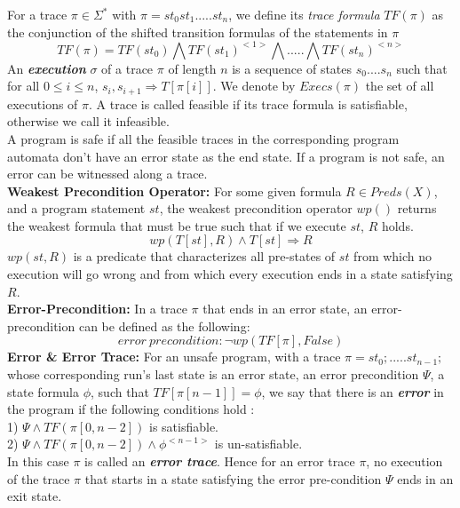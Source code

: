 \documentclass{article}
\begin{document}
For a trace $\pi \in \Sigma^*$ with $\pi = st_0st_1.....st_n$, we define its \textit{trace formula} $TF(\pi)$ as the conjunction of the shifted transition formulas of the statements in $\pi$
$$TF(\pi) = TF(st_0) \bigwedge TF(st_1)^{<1>} \bigwedge ..... \bigwedge TF(st_n)^{<n>}$$
An \textit{\textbf{execution}} $\sigma$ of a trace $\pi$ of length $n$ is a sequence of states $s_0....s_n$ such that for all $0 \leq i \leq n$, $s_i,s_{i+1} \Rightarrow T[\pi[i]]$. We denote by $Execs(\pi)$ the set of all executions of $\pi$.
A trace is called feasible if its trace formula is satisfiable, otherwise we call it infeasible. \\
A program is safe if all the feasible traces in the corresponding program automata don’t have an error state as the end state. If a program is not safe, an error can be witnessed along a trace.\\
\textbf{Weakest Precondition Operator:} For some given formula $R \in Preds(X)$, and a program statement $st$, the weakest precondition operator $wp()$ returns the weakest formula that must be true such that if we execute $st$, $R$ holds. 
$$wp(T[st],R) \wedge T[st] \Rightarrow R$$
$wp(st,R)$ is a predicate that characterizes all pre-states of $st$ from which no execution will go wrong and from which every execution ends in a state satisfying $R$.\\
\textbf{Error-Precondition:} In a trace $\pi$ that ends in an error state, an error-precondition can be defined as the following:
$$error\ precondition:\neg wp(TF[\pi],False)$$
\textbf{Error \& Error Trace: }For an unsafe program, with a trace $\pi = st_0;.....st_{n-1};$ whose corresponding run's last state is an error state, an error precondition $\Psi$, a state formula $\phi$, such that $TF[\pi[n-1]]=\phi$, we say that there is an \textbf{\textit{error}} in the program if the following conditions hold :\\
1) $\Psi \wedge TF(\pi[0,n-2])$ is satisfiable.\\
2) $\Psi \wedge TF(\pi[0,n-2]) \wedge \phi^{<n-1>} $ is un-satisfiable.\\
In this case $\pi$ is called an \textbf{\textit{error trace}}. Hence for an error trace $\pi$, no execution of the trace $\pi$ that starts in a state satisfying the error pre-condition $\Psi$ ends in an exit state.\\
\end{document}

